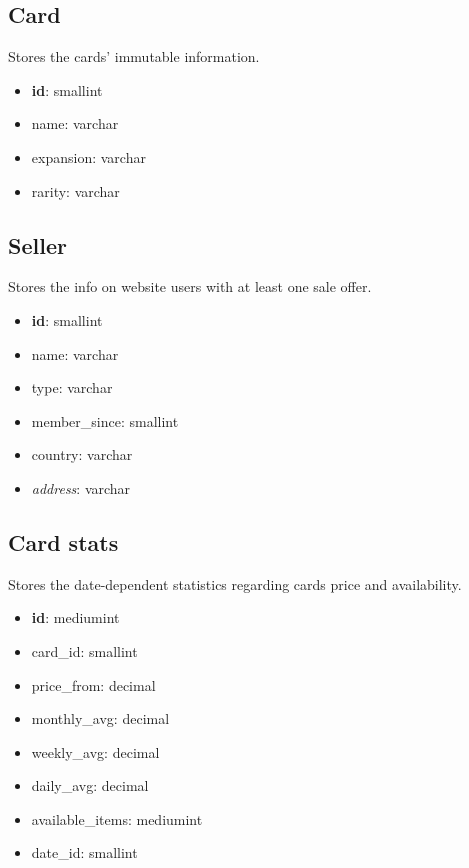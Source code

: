 \subsection{Card}
Stores the cards' immutable information.
\begin{itemize}
\setlength\itemsep{0.2em}
\item \textbf{id}: smallint
\item name: varchar
\item expansion: varchar
\item rarity: varchar
\end{itemize}

\subsection{Seller}
Stores the info on website users with at least one sale offer.
\begin{itemize}
\setlength\itemsep{0.2em}
\item \textbf{id}: smallint
\item name: varchar
\item type: varchar
\item member\_since: smallint
\item country: varchar
\item \textit{address}: varchar
\end{itemize}

\subsection{Card stats}
Stores the date-dependent statistics regarding cards price and availability.
\begin{itemize}
\setlength\itemsep{0.2em}
\item \textbf{id}: mediumint
\item card\_id: smallint
\item price\_from: decimal
\item monthly\_avg: decimal
\item weekly\_avg: decimal
\item daily\_avg: decimal
\item available\_items: mediumint
\item date\_id: smallint
\end{itemize}

